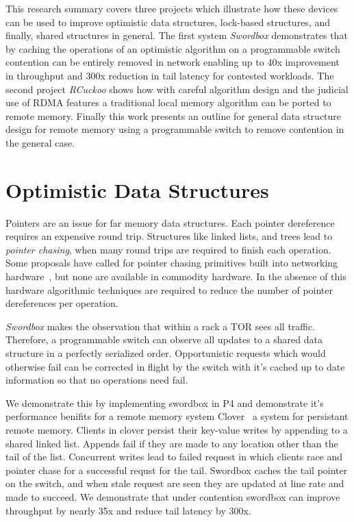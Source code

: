 This research summary covers three projects which illustrate
how these devices can be used to improve optimistic data
structures, lock-based structures, and finally, shared
structures in general.  The first system \textit{Swordbox}
demonstrates that by caching the operations of an optimistic
algorithm on a programmable switch contention can be
entirely removed in network enabling up to 40x improvement
in throughput and 300x reduction in tail latency for
contested workloads. The second project \textit{RCuckoo}
shows how with careful algorithm design and the judicial use
of RDMA features a traditional local memory algorithm can be
ported to remote memory. Finally this work presents an
outline for general data structure design for remote memory
using a programmable switch to remove contention in the
general case.


\section{Optimistic Data Structures}

Pointers are an issue for far memory data structures. Each
pointer dereference requires an expensive round trip.
Structures like linked lists, and trees lead to
\textit{pointer chasing}, when many round trips are required
to finish each operation. Some proposals have called for
pointer chasing primitives built into networking
hardware~\cite{prisim, supernic}, but none are available in
commodity hardware. In the absence of this hardware
algorithmic techniques are required to reduce the number of
pointer dereferences per operation.

\textit{Swordbox} makes the observation that within a rack a
TOR sees all traffic. Therefore, a programmable switch can
observe all updates to a shared data structure in a
perfectly serialized order. Opportunistic requests which
would otherwise fail can be corrected in flight by the
switch with it's cached up to date information so that no
operations need fail.

We demonstrate this by implementing swordbox in P4 and
demonstrate it's performance benifits for a remote memory
system Clover~\cite{clover} a system for persistant remote
memory. Clients in clover persist their key-value writes by
appending to a shared linked list. Appends fail if they are
made to any location other than the tail of the list.
Concurrent writes lead to failed request in which clients
race and pointer chase for a successful requst for the tail.
Swordbox caches the tail pointer on the switch, and when
stale request are seen they are updated at line rate and
made to succeed.  We demonstrate that under contention
swordbox can improve throughput by nearly 35x and reduce
tail latency by 300x. 

